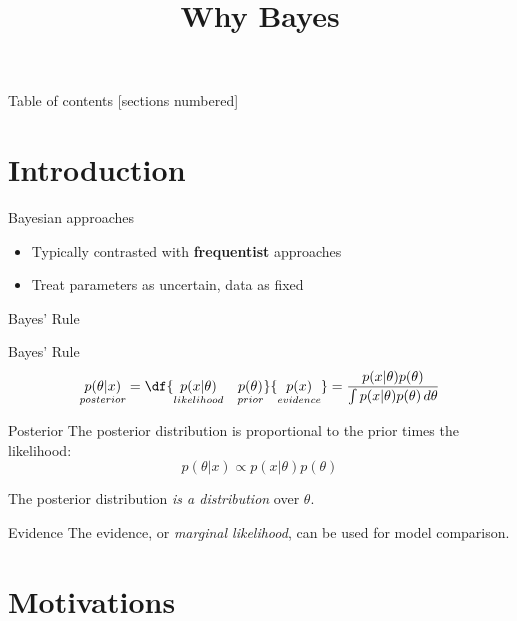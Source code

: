 \documentclass[10pt]{beamer}
\title{Why Bayes}
\begin{document}
\maketitle

\begin{frame}{Table of contents}
  [sections numbered] \tableofcontents[hideallsubsections]
\end{frame}

\section{Introduction}
\begin{frame}{Bayesian approaches}

\begin{itemize}
\item Typically contrasted with \textbf{frequentist} approaches
\item Treat parameters as uncertain, data as fixed
\end{itemize}
\end{frame}


\begin{frame}{Bayes' Rule}
\footnotesize

\begin{sblock}{Bayes' Rule}
\[ \underset{posterior}{p(\theta|x)} = \df{ \underset{likelihood}{p(x|\theta)} \quad  \underset{prior}{p(\theta)} }{ \underset{evidence}{p(x)}}  = \dfrac{p(x | \theta) p(\theta)}{\int p(x | \theta) p(\theta) \, d\theta}  \]
\end{sblock}

\begin{sblock}{Posterior}
The posterior distribution is proportional to the prior times the likelihood:
\[p(\theta | x) \propto p(x | \theta) p(\theta)\]

The posterior distribution \textit{is a distribution} over $\theta$.

\end{sblock}

\begin{sblock}{Evidence}
The evidence, or \textit{marginal likelihood}, can be used for model comparison.
\end{sblock}

\end{frame}


\section{Motivations}
\end{document}
